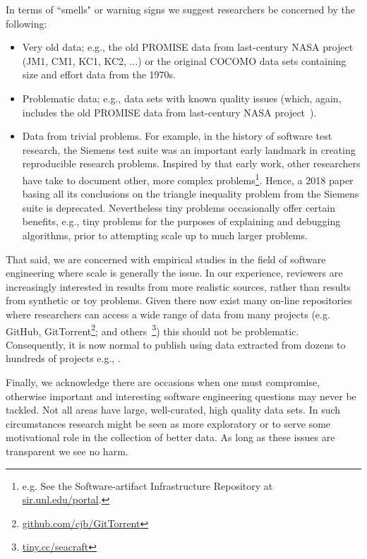 \documentclass[preprint,10pt]{elsarticle}
\begin{document}
In terms of ``smells" or warning signs we suggest researchers be concerned by the following:
\begin{itemize}
\item Very old data; e.g., the old PROMISE data from last-century NASA project (JM1, CM1, KC1, KC2, ...) or the original COCOMO data sets containing size and effort data from the 1970s.
\item Problematic data; e.g., data sets with known quality issues (which, again, includes the old PROMISE data from last-century NASA project~\cite{shepperd13}).
\item Data from trivial problems.
For example, in the history of
software test research, the Siemens test suite
was an important early landmark in creating reproducible research problems. Inspired by that early work, other researchers have take to document other, more complex problems\footnote{e.g. See the Software-artifact Infrastructure Repository at
\href{http://sir.unl.edu/portal}{sir.unl.edu/portal}.}. Hence, a 2018 paper basing all its conclusions on the triangle inequality problem
from the Siemens suite is deprecated.   Nevertheless tiny problems occasionally offer certain benefits, e.g., tiny problems for the purposes of explaining and debugging algorithms, prior to attempting scale up to much larger problems. 
\end{itemize}

That said, we are concerned with empirical studies in the field of software engineering where scale is generally the issue. In our experience, reviewers are increasingly interested in results from more realistic sources, rather than results from synthetic or toy problems. Given there now exist many on-line repositories where researchers can access a wide range of data from many projects (e.g. GitHub, GitTorrent\footnote{\href{https://github.com/cjb/GitTorrent}{github.com/cjb/GitTorrent}}; and others~\footnote{\href{http://tiny.cc/seacraft}{tiny.cc/seacraft}}) this should not be problematic. Consequently, it is now normal to publish using data extracted from dozens to hundreds of projects e.g., \cite{rahulSEIP, amritSeip18b}.

Finally, we acknowledge there are occasions when one must compromise, otherwise important and interesting software engineering questions may never be tackled.  Not all areas have large, well-curated, high quality data sets.  In such circumstances research might be seen as more exploratory or to serve some motivational role in the collection of better data.  As long as these issues are transparent we see no harm.
\end{document}
